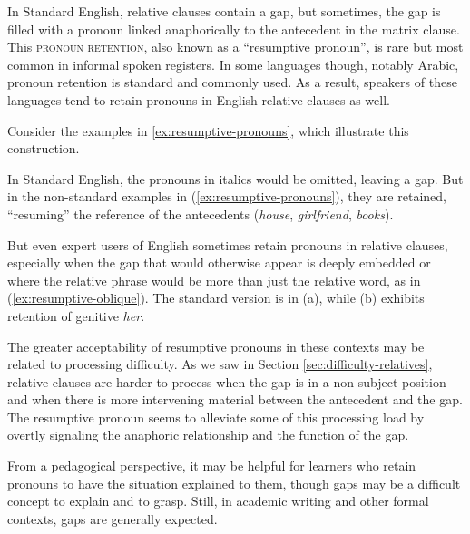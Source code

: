 In Standard English, relative clauses contain a gap, but sometimes, the gap is filled with a pronoun linked anaphorically to the antecedent in the matrix clause. This \textsc{pronoun retention}, also known as a ``resumptive pronoun'', is rare but most common in informal spoken registers. In some languages though, notably Arabic, pronoun retention is standard and commonly used. As a result, speakers of these languages tend to retain pronouns in English relative clauses as well.

Consider the examples in \ref{ex:resumptive-pronouns}, which illustrate this construction.
\ea \label{ex:resumptive-pronouns}
    \z
\z

In Standard English, the pronouns in italics would be omitted, leaving a gap. But in the non-standard examples in (\ref{ex:resumptive-pronouns}), they are retained, ``resuming'' the reference of the antecedents (\textit{house}, \textit{girlfriend}, \textit{books}).

But even expert users of English sometimes retain pronouns in relative clauses, especially when the gap that would otherwise appear is deeply embedded or where the relative phrase would be more than just the relative word, as in (\ref{ex:resumptive-oblique}). The standard version is in (a), while (b) exhibits retention of genitive \textit{her}.

\ea \label{ex:resumptive-oblique}
    \z
\z

The greater acceptability of resumptive pronouns in these contexts may be related to processing difficulty. As we saw in Section \ref{sec:difficulty-relatives}, relative clauses are harder to process when the gap is in a non-subject position and when there is more intervening material between the antecedent and the gap. The resumptive pronoun seems to alleviate some of this processing load by overtly signaling the anaphoric relationship and the function of the gap.

From a pedagogical perspective, it may be helpful for learners who retain pronouns to have the situation explained to them, though gaps may be a difficult concept to explain and to grasp. Still, in academic writing and other formal contexts, gaps are generally expected.

